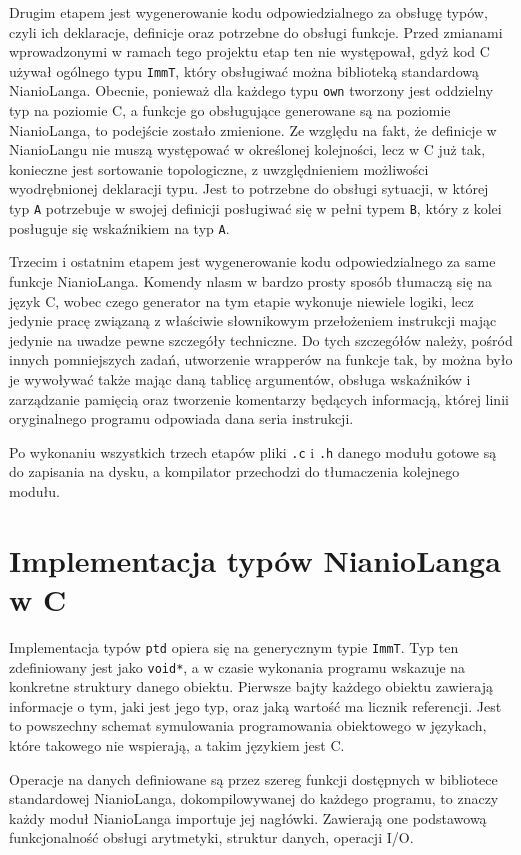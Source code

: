 \documentclass[licencjacka]{pracamgr}
\begin{document}
Drugim etapem jest wygenerowanie kodu odpowiedzialnego za obsługę typów, czyli ich deklaracje, definicje oraz potrzebne do obsługi funkcje. Przed
zmianami wprowadzonymi w ramach tego projektu etap ten nie występował, gdyż kod C używał ogólnego typu \texttt{ImmT}, który obsługiwać można
biblioteką standardową NianioLanga. Obecnie, ponieważ dla każdego typu \texttt{own} tworzony jest oddzielny typ na poziomie C, a funkcje go
obsługujące generowane są na poziomie NianioLanga, to podejście zostało zmienione. Ze względu na fakt, że definicje w NianioLangu nie muszą występować
w określonej kolejności, lecz w C już tak, konieczne jest sortowanie topologiczne, z uwzględnieniem możliwości wyodrębnionej deklaracji typu. Jest to
potrzebne do obsługi sytuacji, w której typ \texttt{A} potrzebuje w swojej definicji posługiwać się w pełni typem \texttt{B}, który z kolei posługuje
się wskaźnikiem na typ \texttt{A}.


Trzecim i ostatnim etapem jest wygenerowanie kodu odpowiedzialnego za same funkcje NianioLanga. Komendy nlasm w bardzo prosty sposób tłumaczą się na
język C, wobec czego generator na tym etapie wykonuje niewiele logiki, lecz jedynie pracę związaną z właściwie słownikowym przełożeniem instrukcji
mając jedynie na uwadze pewne szczegóły techniczne. Do tych szczegółów należy, pośród innych pomniejszych zadań, utworzenie wrapperów na funkcje tak,
by można było je wywoływać także mając daną tablicę argumentów, obsługa wskaźników i zarządzanie pamięcią oraz tworzenie komentarzy będących
informacją, której linii oryginalnego programu odpowiada dana seria instrukcji.


Po wykonaniu wszystkich trzech etapów pliki \texttt{.c} i \texttt{.h} danego modułu gotowe są do zapisania na dysku, a kompilator przechodzi do
tłumaczenia kolejnego modułu.
\section{Implementacja typów NianioLanga w C}
\label{sec:c_types_implementation}
Implementacja typów \texttt{ptd} opiera się na generycznym typie \texttt{ImmT}. Typ ten zdefiniowany jest jako \texttt{void*}, a w czasie wykonania
programu wskazuje na konkretne struktury danego obiektu. Pierwsze bajty każdego obiektu zawierają informacje o tym, jaki jest jego typ, oraz jaką
wartość ma licznik referencji. Jest to powszechny schemat symulowania programowania obiektowego w językach, które takowego nie wspierają, a takim
językiem jest C.


Operacje na danych definiowane są przez szereg funkcji dostępnych w bibliotece standardowej NianioLanga, dokompilowywanej do każdego programu, to
znaczy każdy moduł NianioLanga importuje jej nagłówki. Zawierają one podstawową funkcjonalność obsługi arytmetyki, struktur danych, operacji I/O.
\end{document}
